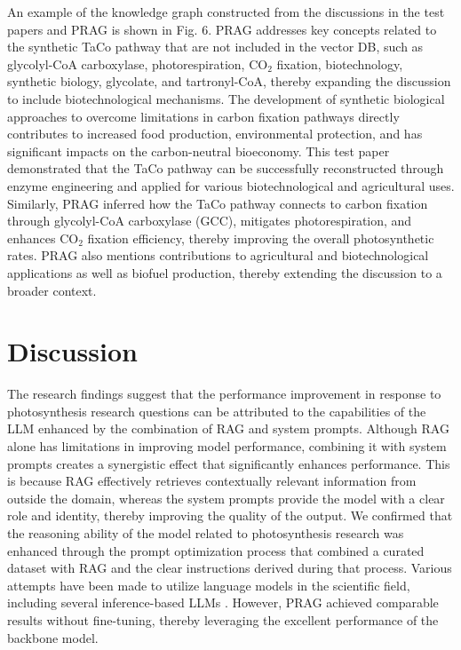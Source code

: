 \documentclass[12pt]{article}
\begin{document}
An example of the knowledge graph constructed from the discussions in the test papers and PRAG is shown in Fig. 6. PRAG addresses key concepts related to the synthetic TaCo pathway that are not included in the vector DB, such as glycolyl-CoA carboxylase, photorespiration, CO$_2$ fixation, biotechnology, synthetic biology, glycolate, and tartronyl-CoA, thereby expanding the discussion to include biotechnological mechanisms. The development of synthetic biological approaches to overcome limitations in carbon fixation pathways directly contributes to increased food production, environmental protection, and has significant impacts on the carbon-neutral bioeconomy. This test paper demonstrated that the TaCo pathway can be successfully reconstructed through enzyme engineering and applied for various biotechnological and agricultural uses. Similarly, PRAG inferred how the TaCo pathway connects to carbon fixation through glycolyl-CoA carboxylase (GCC), mitigates photorespiration, and enhances CO$_2$ fixation efficiency, thereby improving the overall photosynthetic rates. PRAG also mentions contributions to agricultural and biotechnological applications as well as biofuel production, thereby extending the discussion to a broader context.

\section{Discussion}
The research findings suggest that the performance improvement in response to photosynthesis research questions can be attributed to the capabilities of the LLM enhanced by the combination of RAG and system prompts. Although RAG alone has limitations in improving model performance, combining it with system prompts creates a synergistic effect that significantly enhances performance. This is because RAG effectively retrieves contextually relevant information from outside the domain, whereas the system prompts provide the model with a clear role and identity, thereby improving the quality of the output. We confirmed that the reasoning ability of the model related to photosynthesis research was enhanced through the prompt optimization process that combined a curated dataset with RAG and the clear instructions derived during that process. Various attempts have been made to utilize language models in the scientific field, including several inference-based LLMs \cite{ref21, ref22, ref23}. However, PRAG achieved comparable results without fine-tuning, thereby leveraging the excellent performance of the backbone model.
\end{document}
